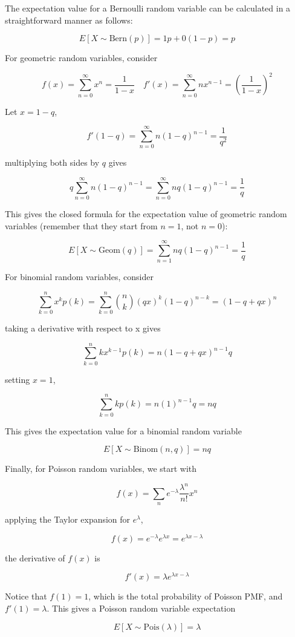 \documentclass[12pt, a4paper]{article}
\begin{document}
The expectation value for a Bernoulli random variable can be calculated in a straightforward manner as follows:

$$E[X\sim\text{Bern}(p)]=1p+0(1-p)=p$$

For geometric random variables, consider

$$f(x)=\sum_{n=0}^\infty x^n = \frac{1}{{1-x}} \quad f'(x)=\sum_{n=0}^\infty nx^{n-1} = \left(\frac{1}{{1-x}}\right)^2$$

Let $x=1-q$,

$$f'(1-q)=\sum_{n=0}^\infty n(1-q)^{n-1} = \frac{1}{q^2}$$

multiplying both sides by $q$ gives

$$q\sum_{n=0}^\infty n(1-q)^{n-1} = \sum_{n=0}^\infty nq(1-q)^{n-1} = \frac{1}{q}$$

This gives the closed formula for the expectation value of geometric random variables (remember that they start from $n=1$, not $n=0$):

$$E[X\sim\text{Geom}(q)]=\sum_{n=1}^\infty nq(1-q)^{n-1}=\frac1q$$

For binomial random variables, consider

$$\sum_{k=0}^n x^k p(k) = \sum_{k=0}^n {n \choose k} (qx)^k (1-q)^{n-k}=(1-q+qx)^n$$

taking a derivative with respect to x gives

$$\sum_{k=0}^n kx^{k-1} p(k) =n(1-q+qx)^{n-1}q$$

setting $x=1$,

$$\sum_{k=0}^n k p(k) =n(1)^{n-1}q=nq$$

This gives the expectation value for a binomial random variable

$$E[X\sim\text{Binom}(n,q)]=nq$$

Finally, for Poisson random variables, we start with

$$f(x)=\sum_n e^{-\lambda} \frac{\lambda^n}{n!}x^n$$

applying the Taylor expansion for $e^\lambda$,

$$f(x)=e^{-\lambda}e^{\lambda x}=e^{\lambda x-\lambda}$$

the derivative of $f(x)$ is

$$f'(x)=\lambda e^{\lambda x-\lambda}$$

Notice that $f(1)=1$, which is the total probability of Poisson PMF, and $f'(1)=\lambda$. This gives a Poisson random variable expectation

$$E[X\sim\text{Pois}(\lambda)]=\lambda$$
\end{document}
